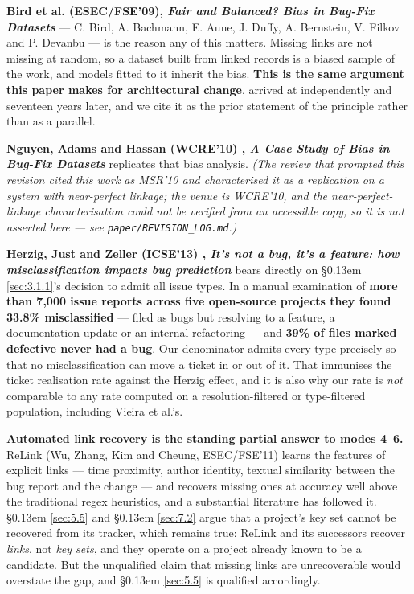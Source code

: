 \documentclass[conference]{IEEEtran}
\begin{document}
\textbf{Bird et al. (ESEC/FSE'09), \emph{Fair and Balanced? Bias in Bug-Fix Datasets}} \cite{bird2009fair} --- C. Bird, A. Bachmann, E. Aune, J. Duffy, A. Bernstein, V. Filkov and P. Devanbu --- is the reason any of this matters. Missing links are not missing at random, so a dataset built from linked records is a biased sample of the work, and models fitted to it inherit the bias. \textbf{This is the same argument this paper makes for architectural change}, arrived at independently and seventeen years later, and we cite it as the prior statement of the principle rather than as a parallel.

\textbf{Nguyen, Adams and Hassan (WCRE'10) \cite{nguyen2010case}, \emph{A Case Study of Bias in Bug-Fix Datasets}} replicates that bias analysis. \emph{(The review that prompted this revision cited this work as MSR'10 and characterised it as a replication on a system with near-perfect linkage; the venue is WCRE'10, and the near-perfect-linkage characterisation could not be verified from an accessible copy, so it is not asserted here --- see \texttt{paper/\allowbreak{}REVISION\_\allowbreak{}LOG.\allowbreak{}md}.)}

\textbf{Herzig, Just and Zeller (ICSE'13) \cite{herzig2013not}, \emph{It's not a bug, it's a feature: how misclassification impacts bug prediction}} bears directly on \S\kern0.13em \ref{sec:3.1.1}'s decision to admit all issue types. In a manual examination of \textbf{more than 7,000 issue reports across five open-source projects they found 33.8\% misclassified} --- filed as bugs but resolving to a feature, a documentation update or an internal refactoring --- and \textbf{39\% of files marked defective never had a bug}. Our denominator admits every type precisely so that no misclassification can move a ticket in or out of it. That immunises the ticket realisation rate against the Herzig effect, and it is also why our rate is \emph{not} comparable to any rate computed on a resolution-filtered or type-filtered population, including Vieira et al.'s.

\textbf{Automated link recovery is the standing partial answer to modes 4--6.} ReLink \cite{wu2011relink} (Wu, Zhang, Kim and Cheung, ESEC/FSE'11) learns the features of explicit links --- time proximity, author identity, textual similarity between the bug report and the change --- and recovers missing ones at accuracy well above the traditional regex heuristics, and a substantial literature has followed it. \S\kern0.13em \ref{sec:5.5} and \S\kern0.13em \ref{sec:7.2} argue that a project's key set cannot be recovered from its tracker, which remains true: ReLink and its successors recover \emph{links}, not \emph{key sets}, and they operate on a project already known to be a candidate. But the unqualified claim that missing links are unrecoverable would overstate the gap, and \S\kern0.13em \ref{sec:5.5} is qualified accordingly.
\end{document}
